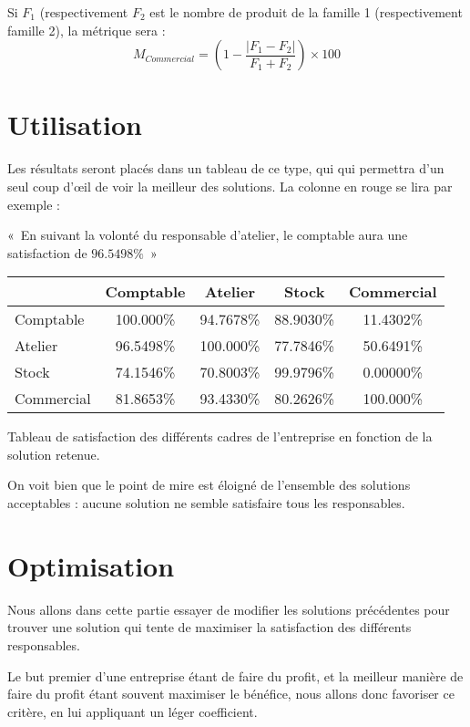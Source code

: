 Si $F_1$ (respectivement $F_2$ est le nombre de produit de la famille 1
(respectivement famille 2), la métrique sera :
$$
M_{Commercial} = \left( 1 - \frac{|F_1 - F_2|}{F_1 + F_2} \right) \times 100
$$

\section{Utilisation}
Les résultats seront placés dans un tableau de ce type, qui qui permettra d'un
seul coup d'œil de voir la meilleur des solutions.
La colonne en rouge se lira par exemple : 
\begin{center}
«~En suivant la volonté du responsable d'atelier, le comptable aura une
satisfaction de $96.5498\%$~»
\end{center}

\begin{minipage}{\linewidth}
    \begin{center}
    \begin{tabular}{|l|c|c|c|c|}
\hline
\cellcolor[gray]{0.9} & Comptable& Atelier & Stock & Commercial  \\
\hline
Comptable  & 100.000\% & 94.7678\% & 88.9030\% & 11.4302\% \\
\hline
Atelier	& 96.5498\% & 100.000\% & 77.7846\% & 50.6491\% \\
\hline
Stock	& 74.1546\% & 70.8003\% & 99.9796\% & 0.00000\% \\
\hline
Commercial & 81.8653\% & 93.4330\% & 80.2626\% & 100.000\% \\
\hline
    \end{tabular}
    \end{center}
    Tableau de satisfaction des différents cadres de l'entreprise en
	fonction de la solution retenue.
\end{minipage}

  
  
  


On voit bien que le point de mire est éloigné de l'ensemble des solutions
acceptables : aucune solution ne semble satisfaire tous les responsables.

\section{Optimisation}
Nous allons dans cette partie essayer de modifier les solutions précédentes
pour trouver une solution qui tente de maximiser la satisfaction des différents
responsables.

Le but premier d'une entreprise étant de faire du profit, et la meilleur manière de
faire du profit étant souvent maximiser le bénéfice, nous allons donc favoriser
ce critère, en lui appliquant un léger coefficient.

